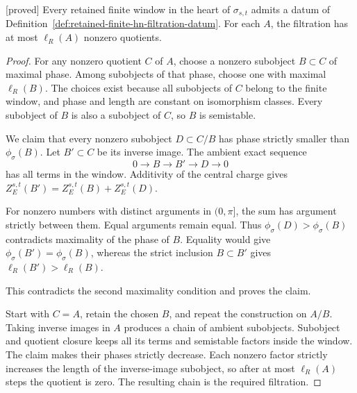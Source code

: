 \begin{proposition}
\label{prop:retained-window-hn-filtration}
\textnormal{[proved]}
Every retained finite window in the heart of \(\sigma_{s,t}\)
admits a datum of
Definition~\ref{def:retained-finite-hn-filtration-datum}.
For each \(A\), the filtration has at most \(\ell_R(A)\) nonzero
quotients.
\end{proposition}

\begin{proof}
For any nonzero quotient \(C\) of \(A\), choose a nonzero subobject
\(B\subset C\) of maximal phase.  Among subobjects of that phase,
choose one with maximal \(\ell_R(B)\).  The choices exist because
all subobjects of \(C\) belong to the finite window, and phase and
length are constant on isomorphism classes.  Every subobject of
\(B\) is also a subobject of \(C\), so \(B\) is semistable.

We claim that every nonzero subobject \(D\subset C/B\) has phase
strictly smaller than \(\phi_\sigma(B)\).  Let \(B'\subset C\)
be its inverse image.  The ambient exact sequence
\[
0\longrightarrow B\longrightarrow B'\longrightarrow D
\longrightarrow0
\]
has all terms in the window.  Additivity of the central charge gives
\(Z_E^{s,t}(B')=Z_E^{s,t}(B)+Z_E^{s,t}(D)\).

For nonzero numbers with distinct arguments in \((0,\pi]\), the
sum has argument strictly between them.  Equal arguments remain equal.
Thus \(\phi_\sigma(D)>\phi_\sigma(B)\) contradicts maximality of
the phase of \(B\).  Equality would give
\(\phi_\sigma(B')=\phi_\sigma(B)\), whereas the strict inclusion
\(B\subset B'\) gives \(\ell_R(B')>\ell_R(B)\).

This contradicts the second maximality condition and proves the
claim.

Start with \(C=A\), retain the chosen \(B\), and repeat the
construction on \(A/B\).  Taking inverse images in \(A\) produces
a chain of ambient subobjects.  Subobject and quotient closure
keeps all its terms and semistable factors inside the window.
The claim makes their phases strictly decrease.  Each nonzero
factor strictly increases the length of the inverse-image
subobject, so after at most \(\ell_R(A)\) steps the quotient is
zero.  The resulting chain is the required filtration.
\end{proof}

